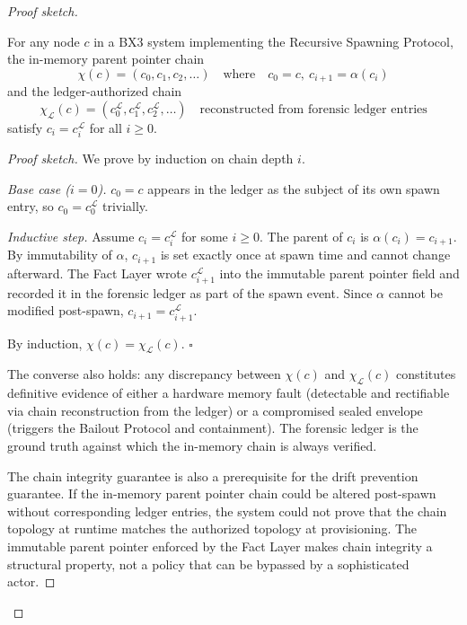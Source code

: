 \begin{proof}[Proof sketch]
\begin{thrm}
\label{thrm:chain-integrity}
For any node $c$ in a BX3 system implementing the Recursive Spawning Protocol, the in-memory parent pointer chain
\begin{equation}
\chi(c) = (c_0, c_1, c_2, \ldots)
\quad\text{where}\quad
c_0 = c,\ c_{i+1} = \alpha(c_i)
\end{equation}
and the ledger-authorized chain
\begin{equation}
\chi_{\mathcal{L}}(c) = (c_0^{\mathcal{L}}, c_1^{\mathcal{L}}, c_2^{\mathcal{L}}, \ldots)
\quad\text{reconstructed from forensic ledger entries}
\end{equation}
satisfy $c_i = c_i^{\mathcal{L}}$ for all $i \geq 0$.
\end{thrm}

\begin{proof}[Proof sketch]
We prove by induction on chain depth $i$.

\medskip
\textit{Base case ($i = 0$).} $c_0 = c$ appears in the ledger as the subject of its own spawn entry, so $c_0 = c_0^{\mathcal{L}}$ trivially.

\medskip
\textit{Inductive step.} Assume $c_i = c_i^{\mathcal{L}}$ for some $i \geq 0$. The parent of $c_i$ is $\alpha(c_i) = c_{i+1}$. By immutability of $\alpha$, $c_{i+1}$ is set exactly once at spawn time and cannot change afterward. The Fact Layer wrote $c_{i+1}^{\mathcal{L}}$ into the immutable parent pointer field and recorded it in the forensic ledger as part of the spawn event. Since $\alpha$ cannot be modified post-spawn, $c_{i+1} = c_{i+1}^{\mathcal{L}}$.

By induction, $\chi(c) = \chi_{\mathcal{L}}(c)$. $\square$
\endproof

The converse also holds: any discrepancy between $\chi(c)$ and $\chi_{\mathcal{L}}(c)$ constitutes definitive evidence of either a hardware memory fault (detectable and rectifiable via chain reconstruction from the ledger) or a compromised sealed envelope (triggers the Bailout Protocol and containment). The forensic ledger is the ground truth against which the in-memory chain is always verified.

The chain integrity guarantee is also a prerequisite for the drift prevention guarantee. If the in-memory parent pointer chain could be altered post-spawn without corresponding ledger entries, the system could not prove that the chain topology at runtime matches the authorized topology at provisioning. The immutable parent pointer enforced by the Fact Layer makes chain integrity a structural property, not a policy that can be bypassed by a sophisticated actor.


\end{proof}
\end{proof}
